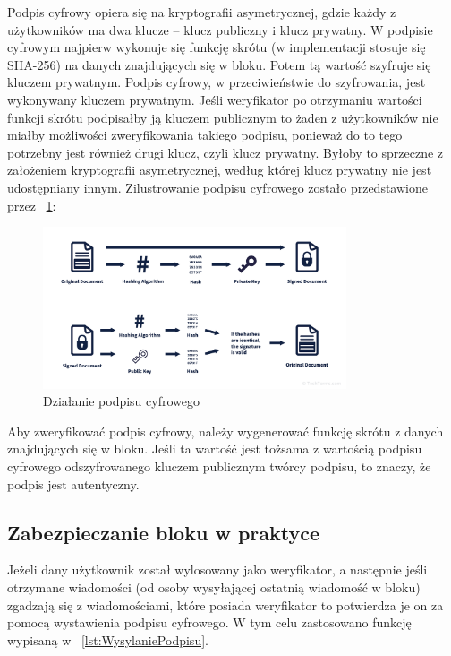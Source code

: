Podpis cyfrowy opiera się na kryptografii asymetrycznej, gdzie każdy z użytkowników ma dwa klucze – klucz publiczny i klucz prywatny. W podpisie cyfrowym najpierw wykonuje się funkcję skrótu (w implementacji stosuje się SHA-256) na danych znajdujących się w bloku. Potem tą wartość szyfruje się kluczem prywatnym. Podpis cyfrowy, w przeciwieństwie do szyfrowania, jest wykonywany kluczem prywatnym. Jeśli weryfikator po otrzymaniu wartości funkcji skrótu podpisałby ją kluczem publicznym to żaden z użytkowników nie miałby możliwości zweryfikowania takiego podpisu, ponieważ do to tego potrzebny jest również drugi klucz, czyli klucz prywatny. Byłoby to sprzeczne z założeniem kryptografii asymetrycznej, według której klucz prywatny nie jest udostępniany innym.
Zilustrowanie podpisu cyfrowego zostało przedstawione przez \figurename{~\ref{fig:DSJP}}:
\begin{figure}[ht]
    \centering
    \includegraphics[width=0.8\textwidth]{Images/DSJPG.jpg}
    \caption{Działanie podpisu cyfrowego}
    \label{fig:DSJP}
\end{figure}

Aby zweryfikować podpis cyfrowy, należy wygenerować funkcję skrótu z danych znajdujących się w bloku. Jeśli ta wartość jest tożsama z wartością podpisu cyfrowego odszyfrowanego kluczem publicznym twórcy podpisu, to znaczy, że podpis jest autentyczny.

\subsection{Zabezpieczanie bloku w praktyce}
\label{ssec:ZabezpieczenieBlokuPraktyka}

Jeżeli dany użytkownik został wylosowany jako weryfikator, a następnie jeśli otrzymane wiadomości (od osoby wysyłającej ostatnią wiadomość w bloku) zgadzają się z wiadomościami, które posiada weryfikator to potwierdza je on za pomocą wystawienia podpisu cyfrowego. W tym celu zastosowano funkcję wypisaną w \lstlistingname{~\ref{lst:WysylaniePodpisu}}.

